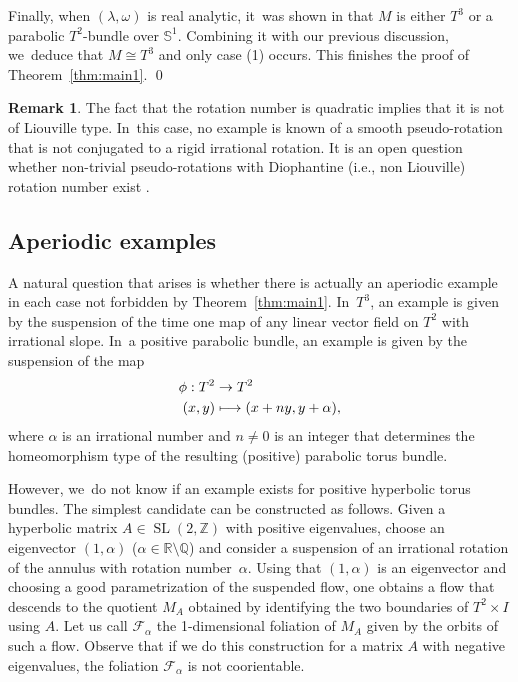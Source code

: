 \documentclass[11pt]{article}
\newcommand{\ie}{i.e.,\xspace}
\newcommand\mto{\mathchoice{\longmapsto}{\mapsto}{\mapsto}{\mapsto}}
\theoremstyle{definition}
\newtheorem{Remark}[theorem]{Remark}
\newcommand{\mS}{\mathbb{S}}
\begin{document}
Finally, when $(\lambda,\omega)$ is real analytic, it~was shown in \cite[\S 4]{Re} that $M$ is either $T^3$ or a parabolic $T^2$-bundle over $\mS^1$. Combining it with our previous discussion, we~deduce that $M\cong T^3$ and only case (1) occurs. This finishes the proof of Theorem~\ref{thm:main1}.
\hfill \qed

\begin{Remark}\label{rem: pseudo-rotation}
The fact that the rotation number is quadratic implies that it is not of Liouville type. In~this case, no example is known of a smooth pseudo-rotation that is not conjugated to a rigid irrational rotation. It is an open question whether non-trivial pseudo-rotations with Diophantine (\ie non Liouville) rotation number exist \cite{FK}.
\end{Remark}

\subsection{Aperiodic examples}
A natural question that arises is whether there is actually an aperiodic example in each case not forbidden by Theorem~\ref{thm:main1}. In~$T^3$, an example is given by the suspension of the time one map of any linear vector field on $T^2$ with irrational slope. In~a positive parabolic bundle, an example is given by the suspension of the map
\begin{align*}
\phi: T^2 &\to T^2\\
	 (x,y) &\mto (x+ny,y+\alpha),
\end{align*}
where $\alpha$ is an irrational number and $n\neq 0$ is an integer that determines the homeomorphism type of the resulting (positive) parabolic torus bundle.

However, we~do not know if an example exists for positive hyperbolic torus bundles. The simplest candidate can be constructed as follows. Given a hyperbolic matrix $A\in \operatorname{SL}(2,\mathbb{Z})$ with positive eigenvalues, choose an eigenvector $(1,\alpha)$
($\alpha \in \mathbb{R}\setminus \mathbb{Q}$) and consider a suspension of an irrational rotation of the annulus with rotation number~$\alpha$. Using that $(1,\alpha)$ is an eigenvector and choosing a good parametrization of the suspended flow, one obtains a flow that descends to the quotient $M_A$ obtained by identifying the two boundaries of $T^2\times I$ using $A$. Let us call $\mathcal{F}_\alpha$ the 1-dimensional foliation of $M_A$ given by the orbits of such a flow. Observe that if we do this construction for a matrix $A$ with negative eigenvalues, the foliation $\mathcal{F}_\alpha$ is not coorientable.
\end{document}
